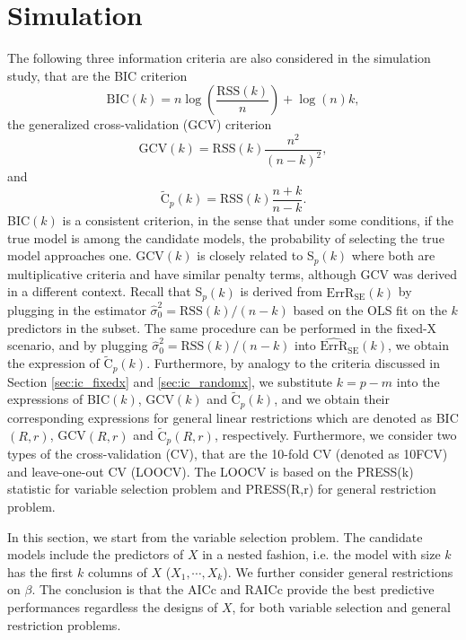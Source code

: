 \section{Simulation}
\label{sec:simulation}
The following three information criteria are also considered in the simulation study, that are the BIC criterion \citep{schwarz1978estimating}
\begin{equation*}
\text{BIC}(k) = n \log\left( \frac{\text{RSS}(k)}{n} \right) +\log(n) k,
\end{equation*}
the generalized cross-validation (GCV) criterion \citep{craven1978smoothing}
\begin{equation*}
\text{GCV}(k) = \text{RSS}(k)\frac{n^2}{(n-k)^2},
\end{equation*}
and 
\begin{equation*}
\tilde{\text{C}}_p(k) = \text{RSS}(k)\frac{n+k}{n-k}.
\end{equation*}
BIC$(k)$ is a consistent criterion, in the sense that under some conditions, if the true model is among the candidate models, the probability of selecting the true model approaches one. GCV$(k)$ is closely related to S$_p(k)$ where both are multiplicative criteria and have similar penalty terms, although GCV was derived in a different context. Recall that S$_p(k)$ is derived from $\widehat{\text{ErrR}}_\text{SE}(k)$ by plugging in the estimator $\hat\sigma_0^2 = \text{RSS}(k)/(n-k)$ based on the OLS fit on the $k$ predictors in the subset. The same procedure can be performed in the fixed-X scenario, and by plugging $\hat\sigma_0^2 = \text{RSS}(k)/(n-k)$ into $\widehat{\text{ErrR}}_\text{SE}(k)$, we obtain the expression of $\tilde{\text{C}}_p(k)$. Furthermore, by analogy to the criteria discussed in Section \ref{sec:ic_fixedx} and \ref{sec:ic_randomx}, we substitute $k=p-m$ into the expressions of BIC$(k)$, GCV$(k)$ and $\tilde{\text{C}}_p(k)$, and we obtain their corresponding expressions for general linear restrictions which are denoted as BIC$(R,r)$, GCV$(R,r)$ and $\tilde{\text{C}}_p(R,r)$, respectively. Furthermore, we consider two types of the cross-validation (CV), that are the 10-fold CV (denoted as 10FCV) and leave-one-out CV (LOOCV). The LOOCV is based on the PRESS(k) statistic for variable selection problem and PRESS(R,r) for general restriction problem.

In this section, we start from the variable selection problem. The candidate models include the predictors of $X$ in a nested fashion, i.e. the model with size $k$ has the first $k$ columns of $X$ ($X_1,\cdots,X_k$). We further consider general restrictions on $\beta$. The conclusion is that the AICc and RAICc provide the best predictive performances regardless the designs of $X$, for both variable selection and general restriction problems.  

